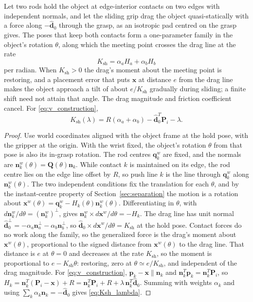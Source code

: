 \begin{proposition}
\label{prop:stiffness}
Let two rods hold the object at edge-interior contacts on two edges with independent normals, and let the sliding grip drag the object quasi-statically with a force along $-\hat{\mathbf d}_0$ through the grasp, as an isotropic pad centred on the grasp gives. The poses that keep both contacts form a one-parameter family in the object's rotation $\theta$, along which the meeting point crosses the drag line at the rate
\begin{equation}
  K_{\mathrm{sh}}=\alpha_aH_a+\alpha_bH_b
  \label{eq:Ksh}
\end{equation}
per radian. When $K_{\mathrm{sh}}>0$ the drag's moment about the meeting point is restoring, and a placement error that puts $\mathbf x$ at distance $e$ from the drag line makes the object approach a tilt of about $e/K_{\mathrm{sh}}$ gradually during sliding; a finite shift need not attain that angle. The drag magnitude and friction coefficient cancel. For \eqref{eq:v_construction},
\begin{equation}
  K_{\mathrm{sh}}(\lambda)=R(\alpha_a+\alpha_b)-\hat{\mathbf d}_0^T\mathbf P_i-\lambda.
  \label{eq:Ksh_lambda}
\end{equation}
\end{proposition}
\begin{proof}
Use world coordinates aligned with the object frame at the hold pose, with the gripper at the origin. With the wrist fixed, the object's rotation $\theta$ from that pose is also its in-grasp rotation. The rod centres $\mathbf q_k^w$ are fixed, and the normals are $\mathbf n_k^w(\theta)=\mathbf Q(\theta)\mathbf n_k$. While contact $k$ is maintained on its edge, the rod centre lies on the edge line offset by $R$, so push line $k$ is the line through $\mathbf q_k^w$ along $\mathbf n_k^w(\theta)$. The two independent conditions fix the translation for each $\theta$, and by the instant-centre property of Section~\ref{sec:separation} the motion is a rotation about $\mathbf x^w(\theta)=\mathbf q_k^w-H_k(\theta)\mathbf n_k^w(\theta)$. Differentiating in $\theta$, with $d\mathbf n_k^w/d\theta=(\mathbf n_k^w)^\perp$, gives $\mathbf n_k^w\times d\mathbf x^w/d\theta=-H_k$. The drag line has unit normal $\hat{\mathbf d}_0^\perp=-\alpha_a\mathbf n_a^\perp-\alpha_b\mathbf n_b^\perp$, so $\hat{\mathbf d}_0\times d\mathbf x^w/d\theta=K_{\mathrm{sh}}$ at the hold pose. Contact forces do no work along the family, so the generalized force is the drag's moment about $\mathbf x^w(\theta)$, proportional to the signed distance from $\mathbf x^w(\theta)$ to the drag line. That distance is $e$ at $\theta=0$ and decreases at the rate $K_{\mathrm{sh}}$, so the moment is proportional to $e-K_{\mathrm{sh}}\theta$: restoring, zero at $\theta\simeq e/K_{\mathrm{sh}}$, and independent of the drag magnitude. For \eqref{eq:v_construction}, $\mathbf p_k-\mathbf x\parallel\mathbf n_k$ and $\mathbf n_k^T\mathbf p_k=\mathbf n_k^T\mathbf P_i$, so $H_k=\mathbf n_k^T(\mathbf P_i-\mathbf x)+R=\mathbf n_k^T\mathbf P_i+R+\lambda\,\mathbf n_k^T\hat{\mathbf d}_0$. Summing with weights $\alpha_k$ and using $\sum_k\alpha_k\mathbf n_k=-\hat{\mathbf d}_0$ gives \eqref{eq:Ksh_lambda}.
\end{proof}

